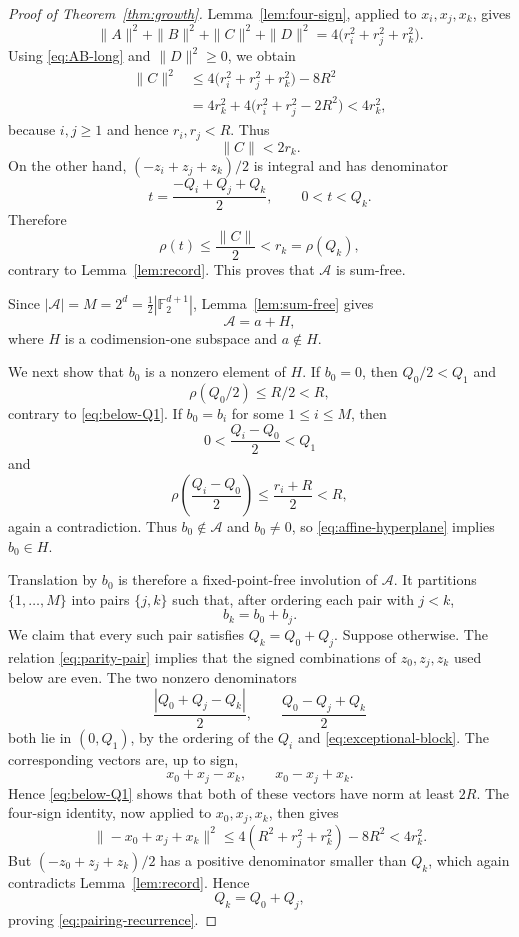\documentclass[11pt,reqno]{amsart}
\theoremstyle{definition}
\newcommand{\F}{\mathbb F}
\newcommand{\0}{\mbf 0}%
\begin{document}
\begin{proof}[Proof of Theorem~\ref{thm:growth}]
Lemma~\ref{lem:four-sign}, applied to $x_i,x_j,x_k$, gives
$$
 \|A\|^2+\|B\|^2+\|C\|^2+\|D\|^2
 =4\bigl(r_i^2+r_j^2+r_k^2\bigr).
$$
Using \eqref{eq:AB-long} and $\|D\|^2\ge0$, we obtain
$$
 \begin{aligned}
 \|C\|^2
 &\le4\bigl(r_i^2+r_j^2+r_k^2\bigr)-8R^2\\
 &=4r_k^2+4\bigl(r_i^2+r_j^2-2R^2\bigr)
 <4r_k^2,
 \end{aligned}
$$
because $i,j\ge1$ and hence $r_i,r_j<R$. Thus
\begin{equation}\label{eq:C-short}
 \|C\|<2r_k.
\end{equation}
On the other hand, $(-z_i+z_j+z_k)/2$ is integral and has denominator
$$
 t=\frac{-Q_i+Q_j+Q_k}{2},
 \qquad 0<t<Q_k.
$$
Therefore
$$
 \rho(t)\le\frac{\|C\|}{2}<r_k=\rho(Q_k),
$$
contrary to Lemma~\ref{lem:record}. This proves that $\mathcal A$ is
sum-free.

Since $|\mathcal A|=M=2^d=\frac12|\F_2^{d+1}|$,
Lemma~\ref{lem:sum-free} gives
\begin{equation}\label{eq:affine-hyperplane}
 \mathcal A=a+H,
\end{equation}
where $H$ is a codimension-one subspace and $a\notin H$.

We next show that $b_0$ is a nonzero element of $H$. If $b_0=0$, then
$Q_0/2<Q_1$ and
$$
 \rho(Q_0/2)\le R/2<R,
$$
contrary to \eqref{eq:below-Q1}. If $b_0=b_i$ for some $1\le i\le M$, then
$$
 0<\frac{Q_i-Q_0}{2}<Q_1
$$
and
$$
 \rho\left(\frac{Q_i-Q_0}{2}\right)
 \le\frac{r_i+R}{2}<R,
$$
again a contradiction. Thus $b_0\notin\mathcal A$ and $b_0\ne0$, so
\eqref{eq:affine-hyperplane} implies $b_0\in H$.

Translation by $b_0$ is therefore a fixed-point-free involution of
$\mathcal A$. It partitions $\{1,\ldots,M\}$ into pairs $\{j,k\}$ such that,
after ordering each pair with $j<k$,
\begin{equation}\label{eq:parity-pair}
 b_k=b_0+b_j.
\end{equation}
We claim that every such pair satisfies $Q_k=Q_0+Q_j$. Suppose otherwise.
The relation \eqref{eq:parity-pair} implies that the signed combinations of
$z_0,z_j,z_k$ used below are even. The two nonzero denominators
$$
 \frac{|Q_0+Q_j-Q_k|}{2},
 \qquad
 \frac{Q_0-Q_j+Q_k}{2}
$$
both lie in $(0,Q_1)$, by the ordering of the $Q_i$ and
\eqref{eq:exceptional-block}. The corresponding vectors are,
up to sign,
$$
 x_0+x_j-x_k,\qquad x_0-x_j+x_k.
$$
Hence \eqref{eq:below-Q1} shows that both of these vectors have norm at
least $2R$. The four-sign identity, now applied
to $x_0,x_j,x_k$, then gives
$$
 \|-x_0+x_j+x_k\|^2
 \le4(R^2+r_j^2+r_k^2)-8R^2
 <4r_k^2.
$$
But $(-z_0+z_j+z_k)/2$ has a positive denominator smaller than $Q_k$, which
again contradicts Lemma~\ref{lem:record}. Hence
$$
 Q_k=Q_0+Q_j,
$$
proving \eqref{eq:pairing-recurrence}.


\end{proof}
\end{document}
